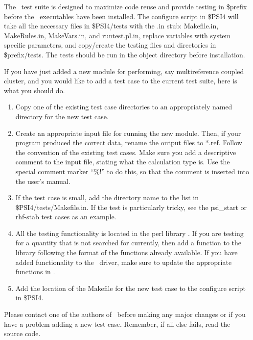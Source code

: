 The \PSIfour\ test suite is designed to maximize code reuse and
provide testing in \$prefix before the \PSIfour\
executables have been installed. The configure script in \$PSI4 
will take all the necessary files in \$PSI4/tests
with the .in stub: Makefile.in, MakeRules.in, MakeVars.in,
and runtest.pl.in, replace variables with system specific parameters,
and copy/create the testing files and directories in \$prefix/tests.
The tests should be run in the object directory before installation.

If you have just added a new module for performing, say multireference 
coupled cluster, and you would like to add a test case to the current 
test suite, here is what you should do.  
\begin{enumerate}
\item Copy one of the existing test case directories to an 
      appropriately named directory for the new test case.

\item Create an appropriate input file for running the new module. 
      Then, if your program produced the correct data, rename
      the output files to *.ref. Follow the convention of the 
      existing test cases. Make sure you add a descriptive comment to the
      input file, stating what the calculation type is.  Use the special comment
      marker ``\%!'' to do this, so that the comment is inserted into the user's
      manual.

\item If the test case is small, add the directory name to the list
      in \$PSI4/tests/Makefile.in.  If the test is particularly tricky,
      see the psi\_start or rhf-stab test cases as an example.

\item All the testing functionality is located in the perl library
      \file{runtest.pl.in}. If you are testing for a quantity that
      is not searched for currently, then add a function to the 
      library following the format of the functions already available.
      If you have added functionality to the \PSIfour\ driver,
      make sure to update the appropriate functions in .

\item Add the location of the Makefile for the new test case
      to the configure script in \$PSI4.

\end{enumerate}

Please contact one of the authors of \PSIfour\ before making any
major changes or if you have a problem adding a new test case.
Remember, if all else fails, read the source code.

